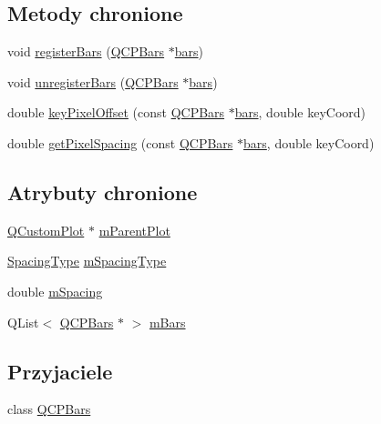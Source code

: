 \subsection*{Metody chronione}
\begin{DoxyCompactItemize}
\item 
void \hyperlink{class_q_c_p_bars_group_a7b00514f19ad58d0bb3fd5246a67fae2}{register\+Bars} (\hyperlink{class_q_c_p_bars}{Q\+C\+P\+Bars} $\ast$\hyperlink{class_q_c_p_bars_group_a7c72ed1f8cd962c93b8c42ab96cd91ec}{bars})
\item 
void \hyperlink{class_q_c_p_bars_group_ac7073cdd7b1a40c6cb4b5f908145f8c4}{unregister\+Bars} (\hyperlink{class_q_c_p_bars}{Q\+C\+P\+Bars} $\ast$\hyperlink{class_q_c_p_bars_group_a7c72ed1f8cd962c93b8c42ab96cd91ec}{bars})
\item 
double \hyperlink{class_q_c_p_bars_group_a8e2ca6002e7bab49670144d048a2bcc9}{key\+Pixel\+Offset} (const \hyperlink{class_q_c_p_bars}{Q\+C\+P\+Bars} $\ast$\hyperlink{class_q_c_p_bars_group_a7c72ed1f8cd962c93b8c42ab96cd91ec}{bars}, double key\+Coord)
\item 
double \hyperlink{class_q_c_p_bars_group_a0beccd41bc3841a4c5b284823bc7d2de}{get\+Pixel\+Spacing} (const \hyperlink{class_q_c_p_bars}{Q\+C\+P\+Bars} $\ast$\hyperlink{class_q_c_p_bars_group_a7c72ed1f8cd962c93b8c42ab96cd91ec}{bars}, double key\+Coord)
\end{DoxyCompactItemize}
\subsection*{Atrybuty chronione}
\begin{DoxyCompactItemize}
\item 
\hyperlink{class_q_custom_plot}{Q\+Custom\+Plot} $\ast$ \hyperlink{class_q_c_p_bars_group_a973d408cfbf88db95115aec71877f9e7}{m\+Parent\+Plot}
\item 
\hyperlink{class_q_c_p_bars_group_a4c0521120a97e60bbca37677a37075b6}{Spacing\+Type} \hyperlink{class_q_c_p_bars_group_a6794ee1a9c81864d627bff6a4b2d64ec}{m\+Spacing\+Type}
\item 
double \hyperlink{class_q_c_p_bars_group_a56471d7f548ca6141b7a5bf9629f7ece}{m\+Spacing}
\item 
Q\+List$<$ \hyperlink{class_q_c_p_bars}{Q\+C\+P\+Bars} $\ast$ $>$ \hyperlink{class_q_c_p_bars_group_affdb1e9233c277ff5a4c0a1121cf1fc0}{m\+Bars}
\end{DoxyCompactItemize}
\subsection*{Przyjaciele}
\begin{DoxyCompactItemize}
\item 
class \hyperlink{class_q_c_p_bars_group_a721b87c7cdb8e83a90d77fc8a22e7195}{Q\+C\+P\+Bars}
\end{DoxyCompactItemize}



